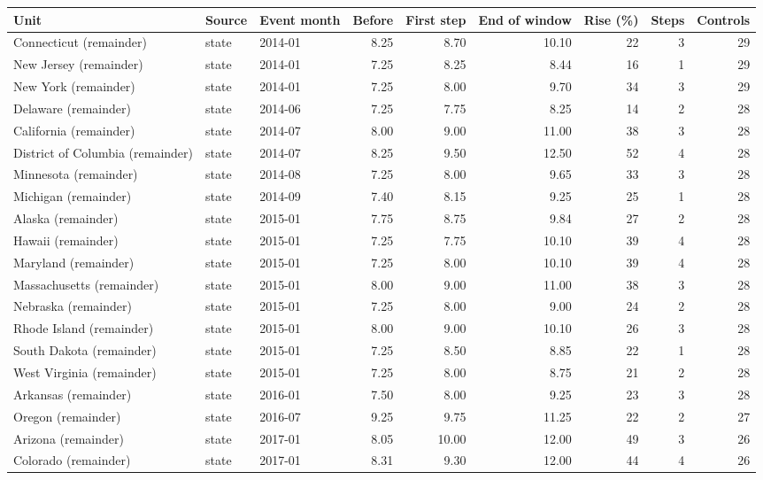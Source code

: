 \begin{tabular}{lllrrrrrr}
\toprule
Unit & Source & Event month & Before & First step & End of window & Rise (\%) & Steps & Controls \\
\midrule
Connecticut (remainder) & state & 2014-01 & 8.25 & 8.70 & 10.10 & 22 & 3 & 29 \\
New Jersey (remainder) & state & 2014-01 & 7.25 & 8.25 & 8.44 & 16 & 1 & 29 \\
New York (remainder) & state & 2014-01 & 7.25 & 8.00 & 9.70 & 34 & 3 & 29 \\
Delaware (remainder) & state & 2014-06 & 7.25 & 7.75 & 8.25 & 14 & 2 & 28 \\
California (remainder) & state & 2014-07 & 8.00 & 9.00 & 11.00 & 38 & 3 & 28 \\
District of Columbia (remainder) & state & 2014-07 & 8.25 & 9.50 & 12.50 & 52 & 4 & 28 \\
Minnesota (remainder) & state & 2014-08 & 7.25 & 8.00 & 9.65 & 33 & 3 & 28 \\
Michigan (remainder) & state & 2014-09 & 7.40 & 8.15 & 9.25 & 25 & 1 & 28 \\
Alaska (remainder) & state & 2015-01 & 7.75 & 8.75 & 9.84 & 27 & 2 & 28 \\
Hawaii (remainder) & state & 2015-01 & 7.25 & 7.75 & 10.10 & 39 & 4 & 28 \\
Maryland (remainder) & state & 2015-01 & 7.25 & 8.00 & 10.10 & 39 & 4 & 28 \\
Massachusetts (remainder) & state & 2015-01 & 8.00 & 9.00 & 11.00 & 38 & 3 & 28 \\
Nebraska (remainder) & state & 2015-01 & 7.25 & 8.00 & 9.00 & 24 & 2 & 28 \\
Rhode Island (remainder) & state & 2015-01 & 8.00 & 9.00 & 10.10 & 26 & 3 & 28 \\
South Dakota (remainder) & state & 2015-01 & 7.25 & 8.50 & 8.85 & 22 & 1 & 28 \\
West Virginia (remainder) & state & 2015-01 & 7.25 & 8.00 & 8.75 & 21 & 2 & 28 \\
Arkansas (remainder) & state & 2016-01 & 7.50 & 8.00 & 9.25 & 23 & 3 & 28 \\
Oregon (remainder) & state & 2016-07 & 9.25 & 9.75 & 11.25 & 22 & 2 & 27 \\
Arizona (remainder) & state & 2017-01 & 8.05 & 10.00 & 12.00 & 49 & 3 & 26 \\
Colorado (remainder) & state & 2017-01 & 8.31 & 9.30 & 12.00 & 44 & 4 & 26 \\

\end{tabular}

